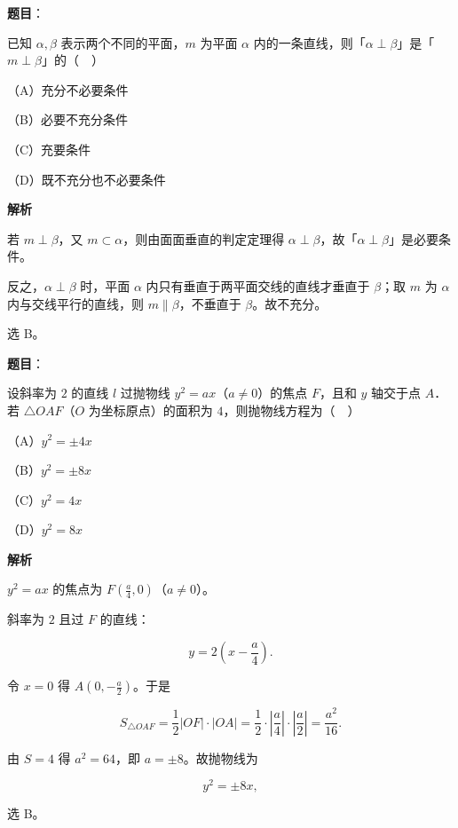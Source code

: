 \begin{answer}

\textbf{题目}：

已知 $\alpha,\beta$ 表示两个不同的平面，$m$ 为平面 $\alpha$ 内的一条直线，则「$\alpha\perp\beta$」是「$m\perp\beta$」的（　）

（A）充分不必要条件

（B）必要不充分条件

（C）充要条件

（D）既不充分也不必要条件

\textbf{解析}

若 $m\perp\beta$，又 $m\subset\alpha$，则由面面垂直的判定定理得 $\alpha\perp\beta$，故「$\alpha\perp\beta$」是必要条件。

反之，$\alpha\perp\beta$ 时，平面 $\alpha$ 内只有垂直于两平面交线的直线才垂直于 $\beta$；取 $m$ 为 $\alpha$ 内与交线平行的直线，则 $m\parallel\beta$，不垂直于 $\beta$。故不充分。

选 B。


\end{answer}
\begin{answer}

\textbf{题目}：

设斜率为 $2$ 的直线 $l$ 过抛物线 $y^2=ax$（$a\neq0$）的焦点 $F$，且和 $y$ 轴交于点 $A$．若 $\triangle OAF$（$O$ 为坐标原点）的面积为 $4$，则抛物线方程为（　）

（A）$y^2=\pm4x$

（B）$y^2=\pm8x$

（C）$y^2=4x$

（D）$y^2=8x$

\textbf{解析}

$y^2=ax$ 的焦点为 $F\left(\frac a4,0\right)$（$a\neq0$）。

斜率为 $2$ 且过 $F$ 的直线：

\nopagebreak[4]
\[y=2\left(x-\frac a4\right).\]

令 $x=0$ 得 $A\left(0,-\frac a2\right)$。于是

\nopagebreak[4]
\[S_{\triangle OAF}=\frac12|OF|\cdot|OA|=\frac12\cdot\left|\frac a4\right|\cdot\left|\frac a2\right|=\frac{a^2}{16}.\]

由 $S=4$ 得 $a^2=64$，即 $a=\pm8$。故抛物线为

\nopagebreak[4]
\[y^2=\pm8x,\]

选 B。


\end{answer}
